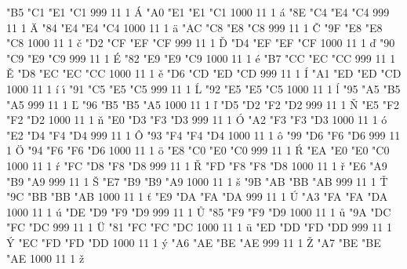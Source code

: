 
  

\setcharcode  "B5  "C1  "E1  "C1   999  11  1  \texaccent \'A
\setcharcode  "A0  "E1  "E1  "C1  1000  11  1  \texaccent \'a
\setcharcode  "8E  "C4  "E4  "C4   999  11  1  \texaccent \"A
\setcharcode  "84  "E4  "E4  "C4  1000  11  1  \texaccent \"a
\setcharcode  "AC  "C8  "E8  "C8   999  11  1  \texaccent \v C
\setcharcode  "9F  "E8  "E8  "C8  1000  11  1  \texaccent \v c
\setcharcode  "D2  "CF  "EF  "CF   999  11  1  \texaccent \v D
\setcharcode  "D4  "EF  "EF  "CF  1000  11  1  \texaccent \v d
\setcharcode  "90  "C9  "E9  "C9   999  11  1  \texaccent \'E
\setcharcode  "82  "E9  "E9  "C9  1000  11  1  \texaccent \'e
\setcharcode  "B7  "CC  "EC  "CC   999  11  1  \texaccent \v E
\setcharcode  "D8  "EC  "EC  "CC  1000  11  1  \texaccent \v e
\setcharcode  "D6  "CD  "ED  "CD   999  11  1  \texaccent \'I
\setcharcode  "A1  "ED  "ED  "CD  1000  11  1  \texaccent \'i  \texaccent \'\i
\setcharcode  "91  "C5  "E5  "C5   999  11  1  \texaccent \'L
\setcharcode  "92  "E5  "E5  "C5  1000  11  1  \texaccent \'l
\setcharcode  "95  "A5  "B5  "A5   999  11  1  \texaccent \v L
\setcharcode  "96  "B5  "B5  "A5  1000  11  1  \texaccent \v l
\setcharcode  "D5  "D2  "F2  "D2   999  11  1  \texaccent \v N
\setcharcode  "E5  "F2  "F2  "D2  1000  11  1  \texaccent \v n
\setcharcode  "E0  "D3  "F3  "D3   999  11  1  \texaccent \'O
\setcharcode  "A2  "F3  "F3  "D3  1000  11  1  \texaccent \'o
\setcharcode  "E2  "D4  "F4  "D4   999  11  1  \texaccent \^O
\setcharcode  "93  "F4  "F4  "D4  1000  11  1  \texaccent \^o
\setcharcode  "99  "D6  "F6  "D6   999  11  1  \texaccent \"O
\setcharcode  "94  "F6  "F6  "D6  1000  11  1  \texaccent \"o
\setcharcode  "E8  "C0  "E0  "C0   999  11  1  \texaccent \'R
\setcharcode  "EA  "E0  "E0  "C0  1000  11  1  \texaccent \'r
\setcharcode  "FC  "D8  "F8  "D8   999  11  1  \texaccent \v R
\setcharcode  "FD  "F8  "F8  "D8  1000  11  1  \texaccent \v r
\setcharcode  "E6  "A9  "B9  "A9   999  11  1  \texaccent \v S
\setcharcode  "E7  "B9  "B9  "A9  1000  11  1  \texaccent \v s
\setcharcode  "9B  "AB  "BB  "AB   999  11  1  \texaccent \v T
\setcharcode  "9C  "BB  "BB  "AB  1000  11  1  \texaccent \v t
\setcharcode  "E9  "DA  "FA  "DA   999  11  1  \texaccent \'U
\setcharcode  "A3  "FA  "FA  "DA  1000  11  1  \texaccent \'u
\setcharcode  "DE  "D9  "F9  "D9   999  11  1  \texaccent \r U
\setcharcode  "85  "F9  "F9  "D9  1000  11  1  \texaccent \r u
\setcharcode  "9A  "DC  "FC  "DC   999  11  1  \texaccent \"U
\setcharcode  "81  "FC  "FC  "DC  1000  11  1  \texaccent \"u
\setcharcode  "ED  "DD  "FD  "DD   999  11  1  \texaccent \'Y
\setcharcode  "EC  "FD  "FD  "DD  1000  11  1  \texaccent \'y
\setcharcode  "A6  "AE  "BE  "AE   999  11  1  \texaccent \v Z
\setcharcode  "A7  "BE  "BE  "AE  1000  11  1  \texaccent \v z


